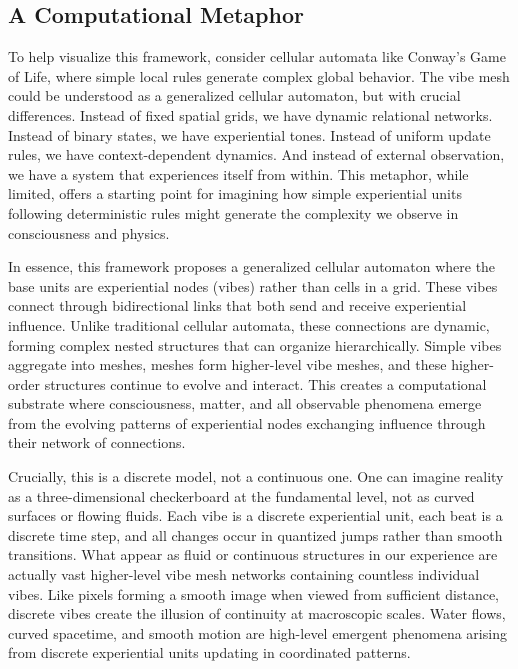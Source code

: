 \subsection{A Computational Metaphor}

To help visualize this framework, consider cellular automata like Conway's Game of Life, where simple local rules generate complex global behavior. The vibe mesh could be understood as a generalized cellular automaton, but with crucial differences. Instead of fixed spatial grids, we have dynamic relational networks. Instead of binary states, we have experiential tones. Instead of uniform update rules, we have context-dependent dynamics. And instead of external observation, we have a system that experiences itself from within. This metaphor, while limited, offers a starting point for imagining how simple experiential units following deterministic rules might generate the complexity we observe in consciousness and physics.

In essence, this framework proposes a generalized cellular automaton where the base units are experiential nodes (vibes) rather than cells in a grid. These vibes connect through bidirectional links that both send and receive experiential influence. Unlike traditional cellular automata, these connections are dynamic, forming complex nested structures that can organize hierarchically. Simple vibes aggregate into meshes, meshes form higher-level vibe meshes, and these higher-order structures continue to evolve and interact. This creates a computational substrate where consciousness, matter, and all observable phenomena emerge from the evolving patterns of experiential nodes exchanging influence through their network of connections.

Crucially, this is a discrete model, not a continuous one. One can imagine reality as a three-dimensional checkerboard at the fundamental level, not as curved surfaces or flowing fluids. Each vibe is a discrete experiential unit, each beat is a discrete time step, and all changes occur in quantized jumps rather than smooth transitions. What appear as fluid or continuous structures in our experience are actually vast higher-level vibe mesh networks containing countless individual vibes. Like pixels forming a smooth image when viewed from sufficient distance, discrete vibes create the illusion of continuity at macroscopic scales. Water flows, curved spacetime, and smooth motion are high-level emergent phenomena arising from discrete experiential units updating in coordinated patterns.

